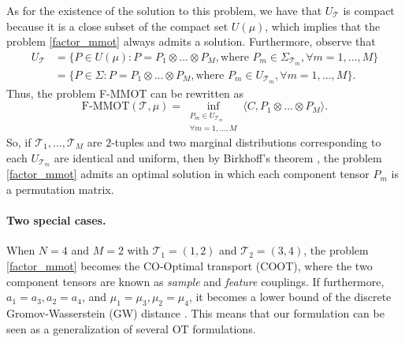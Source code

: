 As for the existence of the solution to this problem, we have that $U_{\mathcal T}$ is compact because it is a close subset of the
compact set $U(\mu)$, which implies that the problem \cref{factor_mmot} always admits a solution. Furthermore, observe that
\begin{equation}
  \begin{split}
    U_{\mathcal T} &= \{ P \in U(\mu): P = P_1 \otimes ... \otimes P_M, \text{where } P_m \in \Sigma_{\mathcal T_m}, \forall m = 1,...,M \} \\
    &= \{ P \in \Sigma: P = P_1 \otimes ... \otimes P_M, \text{where } P_m \in U_{\mathcal T_m}, \forall m = 1,...,M \}.
  \end{split}
\end{equation}
Thus, the problem F-MMOT can be rewritten as
\begin{equation}
  \text{F-MMOT}( \mathcal T, \mu) = \inf_{\substack{P_m \in U_{\mathcal T_m} \\ \forall m = 1,...,M}}
  \langle C, P_1 \otimes ... \otimes P_M \rangle.
\end{equation}
So, if $\mathcal T_1,...,\mathcal T_M$ are $2$-tuples and two marginal distributions corresponding to each $U_{\mathcal T_m}$ are
identical and uniform, then by Birkhoff's theorem \citep{Birkhoff46}, the problem \ref{factor_mmot} admits an optimal solution in
which each component tensor $P_m$ is a permutation matrix.

\paragraph{Two special cases.} When $N = 4$ and $M=2$ with $\mathcal T_1 = (1,2)$ and $\mathcal T_2 = (3,4)$, the problem
\ref{factor_mmot} becomes the CO-Optimal transport (COOT), where the two component tensors are known as
\textit{sample} and \textit{feature} couplings. If furthermore, $a_1 = a_3, a_2=a_4$, and $\mu_1 = \mu_3, \mu_2=\mu_4$, it becomes a
lower bound of the discrete Gromov-Wasserstein (GW) distance \citep{Memoli11}. This means that our formulation can be seen as a
generalization of several OT formulations.

